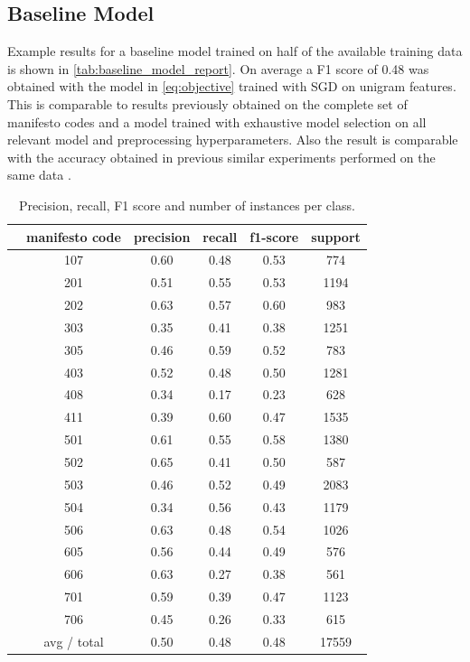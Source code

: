 \documentclass[runningheads,a4paper]{article}
\begin{document}
\subsection{Baseline Model}\label{sec:results_baseline}
Example results for a baseline model trained on half of the available training data is shown in \autoref{tab:baseline_model_report}. On average a F1 score of 0.48 was obtained with the model in \autoref{eq:objective} trained with SGD on unigram features. This is comparable to results previously obtained on the complete set of manifesto codes and a model trained with exhaustive model selection on all relevant model and preprocessing hyperparameters. Also the result is comparable with the accuracy obtained in previous similar experiments performed on the same data \cite{Merz2016}.
\begin{table}
\centering
\begin{tabular}{cccccc}
\toprule
&  manifesto code & precision  &  recall&  f1-score &  support\\
\midrule
&   107&  0.60& 0.48& 0.53&  774\\
&   201&  0.51& 0.55& 0.53& 1194\\
&   202&  0.63& 0.57& 0.60&  983\\
&   303&  0.35& 0.41& 0.38& 1251\\
&   305&  0.46& 0.59& 0.52&  783\\
&   403&  0.52& 0.48& 0.50& 1281\\
&   408&  0.34& 0.17& 0.23&  628\\
&   411&  0.39& 0.60& 0.47& 1535\\
&   501&  0.61& 0.55& 0.58& 1380\\
&   502&  0.65& 0.41& 0.50&  587\\
&   503&  0.46& 0.52& 0.49& 2083\\
&   504&  0.34& 0.56& 0.43& 1179\\
&   506&  0.63& 0.48& 0.54& 1026\\
&   605&  0.56& 0.44& 0.49&  576\\
&   606&  0.63& 0.27& 0.38&  561\\
&   701&  0.59& 0.39& 0.47& 1123\\
&   706&  0.45& 0.26& 0.33&  615\\
\bottomrule
& avg / total&  0.50& 0.48& 0.48&17559\\
\end{tabular}
\caption{Precision, recall, F1 score and number of instances per class. }
\label{tab:baseline_model_report} 
\end{table}
\end{document}
